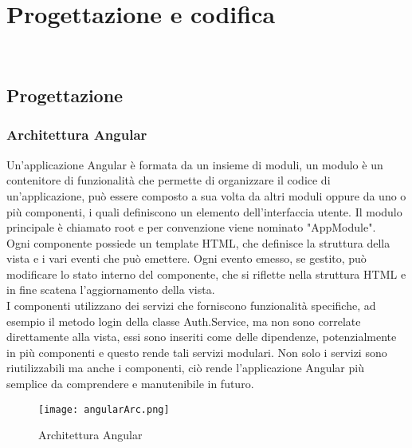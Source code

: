 
\chapter{Progettazione e codifica}
\label{cap:progettazione e codifica}

\\

\section{Progettazione}
\subsection{Architettura Angular}
Un'applicazione Angular è formata da un insieme di moduli, un modulo è un contenitore di funzionalità che permette di organizzare il codice di un'applicazione, può essere composto a sua volta da altri moduli oppure da uno o più componenti, i quali definiscono un elemento dell'interfaccia utente. Il modulo principale è chiamato root e per convenzione viene nominato "AppModule".\\
Ogni componente possiede un template HTML, che definisce la struttura della vista e i vari eventi che può emettere. Ogni evento emesso, se gestito, può modificare lo stato interno del componente, che si riflette nella struttura HTML e in fine scatena l'aggiornamento della vista.\\
I componenti utilizzano dei servizi che forniscono funzionalità specifiche, ad esempio il metodo login della classe Auth.Service, ma non sono correlate direttamente alla vista, essi sono inseriti come delle dipendenze, potenzialmente in più componenti e questo rende tali servizi modulari. Non solo i servizi sono riutilizzabili ma anche i componenti, ciò rende l'applicazione Angular più semplice da comprendere e manutenibile in futuro.\\
\begin{figure}[H]
    \centering
    \texttt{[image: angularArc.png]}
    \caption{Architettura Angular}
\end{figure}
